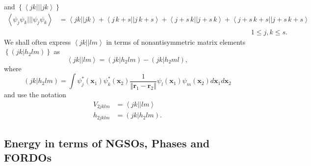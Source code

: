 \documentclass[aps,preprint]{revtex4}%
\begin{document}
and $\left\{  \left\langle jk|||jk\right\rangle \right\}  $
\begin{align}
\left\langle \psi_{j}\psi_{k}|||\psi_{j}\psi_{k}\right\rangle  &
=\left\langle jk||jk\right\rangle +\left\langle j\,k+s||j\,k+s\right\rangle
+\left\langle j+s\,k||j+s\,k\right\rangle +\left\langle
j+s\,k+s||j+s\,k+s\right\rangle \nonumber\\
&  \left.  {}\right.  \qquad\qquad\qquad\qquad\qquad\qquad\qquad\qquad
\qquad\qquad\qquad\qquad\qquad\qquad1\leq j,k\leq s.
\end{align}
We shall often express $\left\langle jk||lm\right\rangle $ in terms of
nonantisymmetric matrix elements $\left\{  \left(  \left.  jk\right\vert
h_{2}lm\right)  \right\}  $ as
\begin{equation}
\left\langle jk||lm\right\rangle =\left(  \left.  jk\right\vert h_{2}%
lm\right)  -\left(  \left.  jk\right\vert h_{2}ml\right)  ,
\end{equation}
where
\begin{equation}
\left(  \left.  jk\right\vert h_{2}lm\right)  =\int\psi_{j}^{\ast}\left(
\mathbf{x}_{1}\right)  \psi_{k}^{\ast}\left(  \mathbf{x}_{2}\right)  \frac
{1}{\left\Vert \mathbf{r}_{1}-\mathbf{r}_{2}\right\Vert }\psi_{l}\left(
\mathbf{x}_{1}\right)  \psi_{m}\left(  \mathbf{x}_{2}\right)  d\mathbf{x}%
_{1}d\mathbf{x}_{2}%
\end{equation}
and use the notation
\begin{align}
V_{2jklm}  &  =\left\langle jk||lm\right\rangle \nonumber\\
h_{2jklm}  &  =\left(  \left.  jk\right\vert h_{2}lm\right)  .
\end{align}


\subsection{Energy in terms of NGSOs, Phases and FORDOs\label{EnON_NGSO}}
\end{document}
